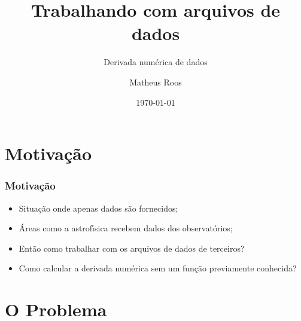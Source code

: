\documentclass[notes=show]{beamer}
\begin{document}
\title[Trabalahndo com arquivos de dados]{Trabalhando com arquivos de dados}
\subtitle{Derivada numérica de dados}
\author[Matheus Roos]{Matheus Roos}
\date{\today}
\maketitle
\begin{frame}
\tableofcontents
\end{frame}

\section{Motiva\c{c}\~{a}o}

\begin{frame}%

\frametitle{Motiva\c{c}\~{a}o}

\begin{itemize}
\item Situa\c{c}\~{a}o onde apenas dados s\~{a}o fornecidos;

\item \'{A}reas como a astrof\'{\i}sica recebem dados dos observat\'{o}rios;

\item Ent\~{a}o como trabalhar com os arquivos de dados de terceiros?

\item Como calcular a derivada num\'{e}rica sem um fun\c{c}\~{a}o
previamente conhecida?
\end{itemize}

\end{frame}%

\section{O Problema}
\end{document}
